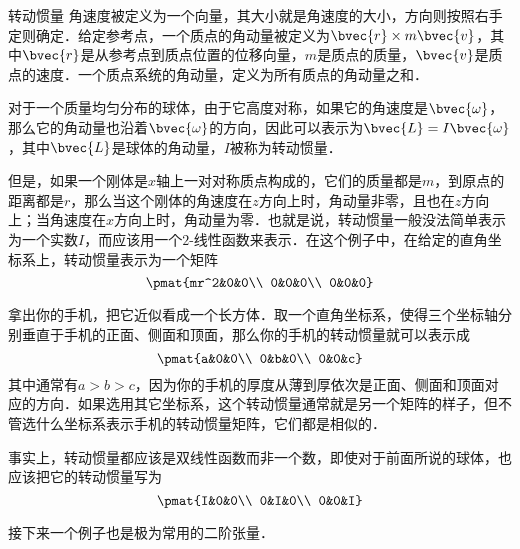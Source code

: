 \begin{example}{转动惯量}
角速度被定义为一个向量，其大小就是角速度的大小，方向则按照右手定则确定．给定参考点，一个质点的角动量被定义为$\bvec{r}\times m\bvec{v}$，其中$\bvec{r}$是从参考点到质点位置的位移向量，$m$是质点的质量，$\bvec{v}$是质点的速度．一个质点系统的角动量，定义为所有质点的角动量之和．

对于一个质量均匀分布的球体，由于它高度对称，如果它的角速度是$\bvec{\omega}$，那么它的角动量也沿着$\bvec{\omega}$的方向，因此可以表示为$\bvec{L}=I\bvec{\omega}$，其中$\bvec{L}$是球体的角动量，$I$被称为转动惯量．

但是，如果一个刚体是$x$轴上一对对称质点构成的，它们的质量都是$m$，到原点的距离都是$r$，那么当这个刚体的角速度在$z$方向上时，角动量非零，且也在$z$方向上；当角速度在$x$方向上时，角动量为零．也就是说，转动惯量一般没法简单表示为一个实数$I$，而应该用一个$2$-线性函数来表示．在这个例子中，在给定的直角坐标系上，转动惯量表示为一个矩阵
\begin{equation}
\pmat{mr^2&0&0\\ 0&0&0\\ 0&0&0}
\end{equation}

拿出你的手机，把它近似看成一个长方体．取一个直角坐标系，使得三个坐标轴分别垂直于手机的正面、侧面和顶面，那么你的手机的转动惯量就可以表示成
\begin{equation}
\pmat{a&0&0\\ 0&b&0\\ 0&0&c}
\end{equation}
其中通常有$a>b>c$，因为你的手机的厚度从薄到厚依次是正面、侧面和顶面对应的方向．如果选用其它坐标系，这个转动惯量通常就是另一个矩阵的样子，但不管选什么坐标系表示手机的转动惯量矩阵，它们都是相似的．

事实上，转动惯量都应该是双线性函数而非一个数，即使对于前面所说的球体，也应该把它的转动惯量写为
\begin{equation}
\pmat{I&0&0\\ 0&I&0\\ 0&0&I}
\end{equation}
\end{example}

接下来一个例子也是极为常用的二阶张量．

